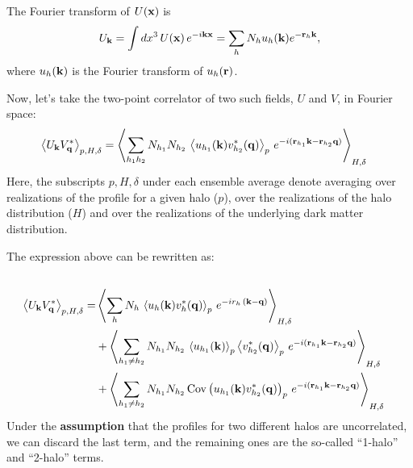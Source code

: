 \documentclass{article}
\begin{document}
  The Fourier transform of $U({\bf x})$ is
  \begin{align}\nonumber
    U_{\bf k}=\int dx^3\,U({\bf x})\,e^{-i{\bf k}{\bf x}}=\sum_h N_h u_h({\bf k}) e^{-{\bf r}_h{\bf k}},
  \end{align}
  where $u_h({\bf k})$ is the Fourier transform of $u_h({\bf r})$.

  Now, let's take the two-point correlator of two such fields, $U$ and $V$, in Fourier space:
  \begin{align}
    \left\langle U_{\bf k}V^*_{\bf q}\right\rangle_{p,H,\delta}&=\left\langle\sum_{h_1h_2}N_{h_1}N_{h_2}\,\left\langle u_{h_1}({\bf k})v^*_{h_2}({\bf q})\right\rangle_p\,e^{-i({\bf r}_{h_1}{\bf k}-{\bf r}_{h_2}{\bf q})}\right\rangle_{H,\delta}
  \end{align}
  Here, the subscripts $p,H,\delta$ under each ensemble average denote averaging over realizations of the profile for a given halo ($p$), over the realizations of the halo distribution ($H$) and over the realizations of the underlying dark matter distribution.

  The expression above can be rewritten as:
  \begin{align}\\
    \left\langle U_{\bf k}V^*_{\bf q}\right\rangle_{p,H,\delta}=&\left\langle\sum_h N_h\,\left\langle u_h({\bf k})v^*_h({\bf q})\right\rangle_p\,e^{-ir_h\,({\bf k}-{\bf q})}\right\rangle_{H,\delta}\\
    &+\left\langle\sum_{h_1\neq h_2}N_{h_1}N_{h_2}\,\left\langle u_{h_1}({\bf k})\right\rangle_p\left\langle v^*_{h_2}({\bf q})\right\rangle_p\,e^{-i({\bf r}_{h_1}{\bf k}-{\bf r}_{h_2}{\bf q})}\right\rangle_{H,\delta}\\
    &+\left\langle\sum_{h_1\neq h_2}N_{h_1}N_{h_2}\,{\rm Cov}\left(u_{h_1}({\bf k})v^*_{h_2}({\bf q})\right)_p\,e^{-i({\bf r}_{h_1}{\bf k}-{\bf r}_{h_2}{\bf q})}\right\rangle_{H,\delta}
  \end{align}
  Under the {\bf assumption} that the profiles for two different halos are uncorrelated, we can discard the last term, and the remaining ones are the so-called ``1-halo'' and ``2-halo'' terms.
\end{document}
